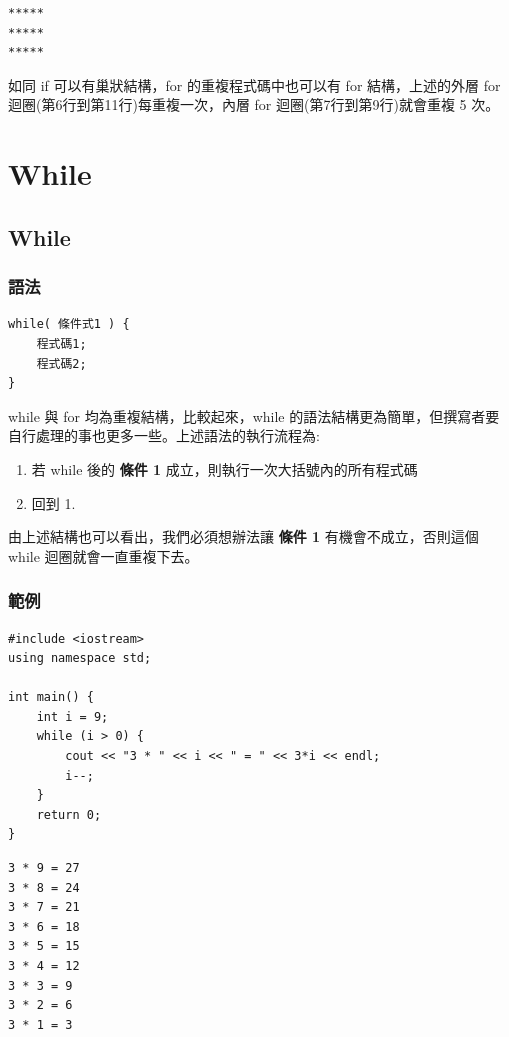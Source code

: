 \documentclass[12pt,a4paper]{article}
\begin{document}
\begin{verbatim}
*****
*****
*****
\end{verbatim}


如同 if 可以有巢狀結構，for 的重複程式碼中也可以有 for 結構，上述的外層 for 迴圈(第6行到第11行)每重複一次，內層 for 迴圈(第7行到第9行)就會重複 5 次。

\section{While}
\label{cpp_while}
\subsection{While}
\label{sec:orgbc54fe0}
\subsubsection{語法}
\label{sec:orge1cce0d}
\lstset{breaklines=true,language=cpp,label= ,caption= ,captionpos=b,firstnumber=1,numbers=left}
\begin{lstlisting}
while( 條件式1 ) {
    程式碼1;
    程式碼2;
}
\end{lstlisting}
while 與 for 均為重複結構，比較起來，while 的語法結構更為簡單，但撰寫者要自行處理的事也更多一些。上述語法的執行流程為:
\begin{enumerate}
\item 若 while 後的 \textbf{條件 1} 成立，則執行一次大括號內的所有程式碼
\item 回到 1.
\end{enumerate}
由上述結構也可以看出，我們必須想辦法讓 \textbf{條件 1} 有機會不成立，否則這個 while 迴圈就會一直重複下去。
\subsubsection{範例}
\label{sec:org2a12ebb}
\lstset{breaklines=true,language=cpp,label= ,caption= ,captionpos=b,firstnumber=1,numbers=left}
\begin{lstlisting}
#include <iostream>
using namespace std;

int main() {
    int i = 9;
    while (i > 0) {
        cout << "3 * " << i << " = " << 3*i << endl;
        i--;
    }
    return 0;
}
\end{lstlisting}

\begin{verbatim}
3 * 9 = 27
3 * 8 = 24
3 * 7 = 21
3 * 6 = 18
3 * 5 = 15
3 * 4 = 12
3 * 3 = 9
3 * 2 = 6
3 * 1 = 3
\end{verbatim}
\end{document}
